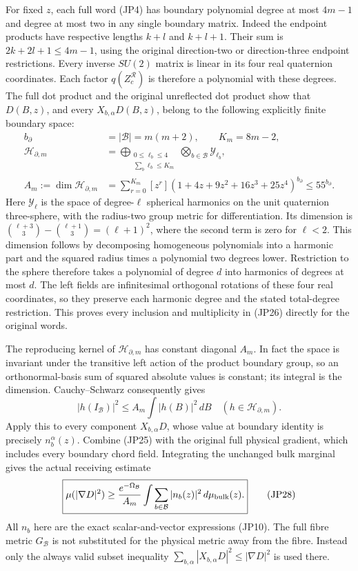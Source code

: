 \documentclass[11pt]{article}
\begin{document}
For fixed \(z\), each full word (JP4) has boundary polynomial degree
at most \(4m-1\) and degree at most two in any single boundary matrix.
Indeed the endpoint products have respective lengths \(k+l\) and
\(k+l+1\). Their sum is \(2k+2l+1\le4m-1\), using the original
direction-two or direction-three endpoint restrictions. Every inverse
\(SU(2)\) matrix is linear in its four real quaternion coordinates.
Each factor \(q(Z_c^{\mathcal R})\) is therefore a polynomial with
these degrees. The full dot product and the original unreflected dot
product show that \(D(B,z)\), and every \(X_{b,\alpha}D(B,z)\), belong
to the following explicitly finite boundary space:
\[
 \begin{aligned}
 b_\partial&=|\mathcal B|=m(m+2),\qquad K_m=8m-2,\\
 \mathcal H_{\partial,m}
 &=\bigoplus_{\substack{0\le\ell_b\le4\\
                        \sum_b\ell_b\le K_m}}
       \bigotimes_{b\in\mathcal B}\mathcal Y_{\ell_b},\\
 A_m:=\dim\mathcal H_{\partial,m}
 &=\sum_{r=0}^{K_m}[z^r]
          (1+4z+9z^2+16z^3+25z^4)^{b_\partial}
 \le55^{b_\partial}.
 \end{aligned}\tag{JP26}
\]
Here \(\mathcal Y_\ell\) is the space of degree-\(\ell\) spherical
harmonics on the unit quaternion three-sphere, with the radius-two
group metric for differentiation. Its dimension is
\(\binom{\ell+3}{3}-\binom{\ell+1}{3}=(\ell+1)^2\), where the second
term is zero for \(\ell<2\). This dimension follows by decomposing
homogeneous polynomials into a harmonic part and the squared radius
times a polynomial two degrees lower. Restriction to the sphere
therefore takes a polynomial of degree \(d\) into harmonics of degrees
at most \(d\). The left fields are infinitesimal orthogonal rotations
of these four real coordinates, so they preserve each harmonic degree
and the stated total-degree restriction. This proves every inclusion
and multiplicity in (JP26) directly for the original words.

The reproducing kernel of \(\mathcal H_{\partial,m}\) has constant
diagonal \(A_m\). In fact the space is invariant under the transitive
left action of the product boundary group, so an orthonormal-basis
sum of squared absolute values is constant; its integral is the
dimension. Cauchy–Schwarz consequently gives
\[
 |h(I_{\mathcal B})|^2\le A_m\int|h(B)|^2\,dB
 \quad(h\in\mathcal H_{\partial,m}).
 \tag{JP27}
\]
Apply this to every component \(X_{b,\alpha}D\), whose value at
boundary identity is precisely \(n_b^\alpha(z)\). Combine (JP25)
with the original full physical gradient, which includes every boundary
chord field. Integrating the unchanged bulk marginal gives the actual
receiving estimate
\[
 \boxed{\displaystyle
 \mu(|\nabla D|^2)\ge
 {e^{-\Omega_{\mathcal B}}\over A_m}
       \int\sum_{b\in\mathcal B}|n_b(z)|^2\,d\mu_{\rm bulk}(z).}
 \tag{JP28}
\]
All \(n_b\) here are the exact scalar-and-vector expressions (JP10).
The full fibre metric \(G_{\mathcal B}\) is not substituted for the
physical metric away from the fibre. Instead only the always valid
subset inequality
\(\sum_{b,\alpha}|X_{b,\alpha}D|^2\le|\nabla D|^2\) is used there.
\end{document}
